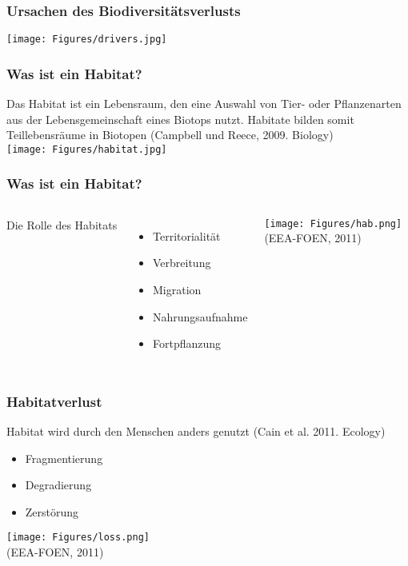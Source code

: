 \documentclass{beamer}
\begin{document}

\begin{frame}
\frametitle{Ursachen des Biodiversitätsverlusts}
\centering
\texttt{[image: Figures/drivers.jpg]}
\end{frame}


\begin{frame}
\frametitle{\LARGE\alert{Was ist ein Habitat?}}
 Das Habitat ist ein Lebensraum, den eine Auswahl von Tier- oder Pflanzenarten aus der Lebensgemeinschaft eines Biotops nutzt. Habitate bilden somit Teillebensräume in Biotopen (Campbell und Reece, 2009. Biology)\\
\vspace{0.3cm}
\texttt{[image: Figures/habitat.jpg]}
\end{frame}


\begin{frame}
\frametitle{Was ist ein Habitat?}
\begin{columns}
\alert{Die Rolle des Habitats}\\
\begin{itemize}
\item Territorialität
\item Verbreitung
\item Migration
\item Nahrungsaufnahme
\item Fortpflanzung
\end{itemize}
\hspace{1cm}
\raggedleft
\texttt{[image: Figures/hab.png]}\\
\centering
\tiny (EEA-FOEN, 2011)
\end{columns}
\end{frame}


\begin{frame}
\frametitle{\LARGE\alert{Habitatverlust}}
Habitat wird durch den Menschen anders genutzt (Cain et al. 2011. Ecology)\\
\begin{itemize}
\item Fragmentierung
\item Degradierung
\item Zerstörung
\end{itemize}
\vspace{1cm}
\centering
\texttt{[image: Figures/loss.png]}\\
\tiny (EEA-FOEN, 2011)
\end{frame}
\end{document}
